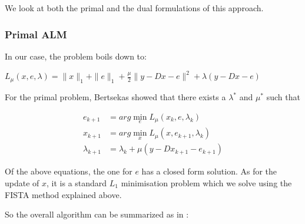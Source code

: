 \documentclass{article} %
\begin{document}
We look at both the primal and the dual formulations of this approach.

\vspace{-.2cm}
\subsubsection{Primal ALM}
\vspace{-.2cm}
In our case, the problem boils down to:
\begin{center}
$L_{\mu}(x,e,\lambda) = \|x\|_1 + \|e\|_1 + \frac{\mu}{2}\|y - Dx - e\|^2 + \lambda (y - Dx - e)$
\end{center}

For the primal problem, Bertsekas \citep{bertsekasnonlinear} showed that there exists a $\lambda^{*}$ and $\mu^{*}$ such that
\begin{center}
\begin{align*}
e_{k+1} &= arg \min_e L_{\mu}(x_k,e,\lambda_k)\\
x_{k+1} &= arg \min_x L_{\mu}(x,e_{k+1},\lambda_k)\\
\lambda_{k+1} &= \lambda_k + \mu(y - Dx_{k+1} - e_{k+1})
\end{align*}
\end{center}

Of the above equations, the one for $e$ has a closed form solution. As for the update of $x$, it is a standard $L_1$ minimisation problem which we solve using the FISTA method explained above.

So the overall algorithm can be summarized as in \citep{yang2010fast}:
\end{document}
